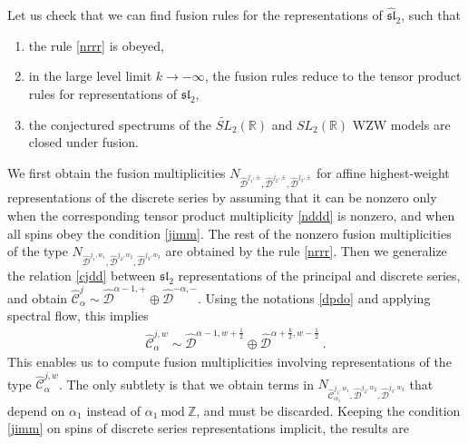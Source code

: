 \documentclass[12pt, a4paper, notitlepage, twoside]{report}
\numberwithin{equation}{section}
\theoremstyle{break}
\begin{document}
Let us check that we can find fusion rules for the representations of $\widehat{\mathfrak{sl}}_2$, such that
\begin{enumerate}
 \item the rule \eqref{nrrr} is obeyed,
\item in the large level limit $k\to -\infty$, the fusion rules reduce to the tensor product rules for representations of $\mathfrak{sl}_2$,
\item the conjectured spectrums of the $\widetilde{SL}_2(\mathbb{R})$ and $SL_2(\mathbb{R})$ WZW models are closed under fusion.
\end{enumerate}
We first obtain the fusion multiplicities $N_{\hat{\mathcal{D}}^{j_1,\pm},\hat{\mathcal{D}}^{j_2,\pm},\hat{\mathcal{D}}^{j_3,\pm}}$ for affine highest-weight representations of the discrete series  by assuming that it can be nonzero only when the corresponding tensor product multiplicity \eqref{nddd} is nonzero, and when all spins obey the condition \eqref{jimm}.
The rest of the nonzero fusion multiplicities of the type    
$N_{\hat{\mathcal{D}}^{j_1,w_1},\hat{\mathcal{D}}^{j_2,w_2},\hat{\mathcal{D}}^{j_3,w_3}}$ are obtained by the rule \eqref{nrrr}.
Then we generalize the relation \eqref{cjdd} between $\mathfrak{sl}_2$ representations of the principal and discrete series, and obtain $\hat{\mathcal{C}}^j_\alpha \sim \hat{\mathcal{D}}^{\alpha-1,+} \oplus \hat{\mathcal{D}}^{-\alpha,-}$. Using the notations \eqref{dpdo} and applying spectral flow, this implies
\begin{align}
 \hat{\mathcal{C}}^{j,w}_\alpha \sim \hat{\mathcal{D}}^{\alpha-1,w+\frac12} \oplus \hat{\mathcal{D}}^{\alpha+\frac{k}{2},w-\frac12} \ .
\end{align}
This enables us to compute fusion multiplicities involving representations of the type $\hat{\mathcal{C}}^{j,w}_\alpha$.
The only subtlety is that we obtain terms in $N_{\hat{\mathcal{C}}^{j_1,w_1}_{\alpha_1},\hat{\mathcal{D}}^{j_2,w_2},\hat{\mathcal{D}}^{j_3,w_3}}$ that depend on $\alpha_1$ instead of $\alpha_1\ \text{mod}\ {\mathbb{Z}}$, and must be discarded.
Keeping the condition \eqref{jimm} on spins of discrete series representations implicit, the results are 
\end{document}
